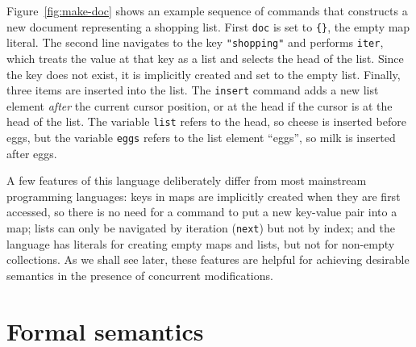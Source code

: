 \documentclass[10pt,journal,compsoc]{IEEEtran}
\begin{document}
Figure~\ref{fig:make-doc} shows an example sequence of commands that constructs a new document representing a shopping list. First \texttt{doc} is set to \verb|{}|, the empty map literal. The second line navigates to the key \texttt{"shopping"} and performs \texttt{iter}, which treats the value at that key as a list and selects the head of the list. Since the key does not exist, it is implicitly created and set to the empty list. Finally, three items are inserted into the list. The \texttt{insert} command adds a new list element \emph{after} the current cursor position, or at the head if the cursor is at the head of the list. The variable \texttt{list} refers to the head, so cheese is inserted before eggs, but the variable \texttt{eggs} refers to the list element ``eggs'', so milk is inserted after eggs.

A few features of this language deliberately differ from most mainstream programming languages: keys in maps are implicitly created when they are first accessed, so there is no need for a command to put a new key-value pair into a map; lists can only be navigated by iteration (\texttt{next}) but not by index; and the language has literals for creating empty maps and lists, but not for non-empty collections. As we shall see later, these features are helpful for achieving desirable semantics in the presence of concurrent modifications.

\section{Formal semantics}\label{sec:semantics}
\end{document}
